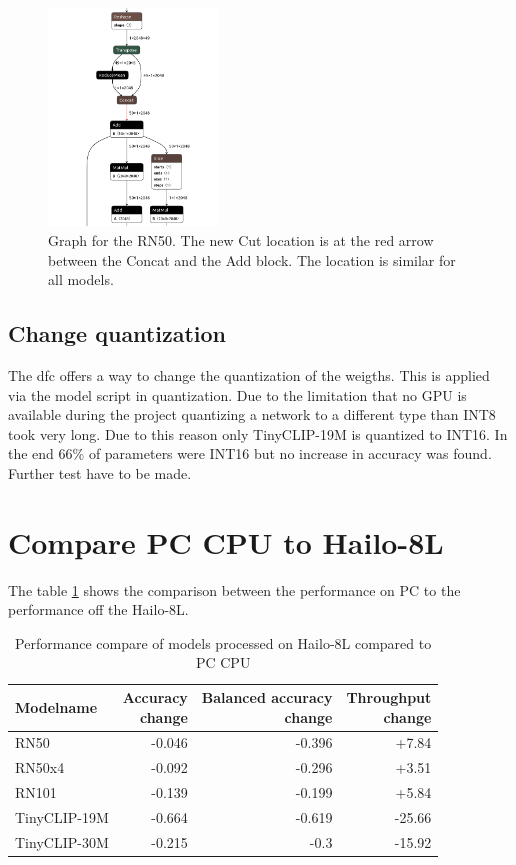 \begin{figure}[]
    \centering
    \includegraphics[width=0.4\textwidth]{Images/Implementation/secondcutlocation.png}
    \caption{Graph for the RN50. The new Cut location is at the red arrow between the Concat and the Add block.
    The location is similar for all models.}
    \label{methods:fig:rn50newcut}
\end{figure}

\subsection{Change quantization}

The \acrshort{dfc} offers a way to change the quantization of the weigths.
This is applied via the model script in quantization.
Due to the limitation that no GPU is available during the project quantizing a network to a different type than INT8 took very long.
Due to this reason only TinyCLIP-19M is quantized to INT16.
In the end 66\% of parameters were INT16 but no increase in accuracy was found.
Further test have to be made.

\section{Compare PC CPU to Hailo-8L}
The table \ref{methods:tab:comparehailopc} shows the comparison between the performance on PC to the performance off the Hailo-8L.
\begin{table}[h!]
    \centering
    \begin{tabular}{l|rrr}
    \hline
    Modelname & \makecell{Accuracy\\change} &  \makecell{Balanced accuracy\\change}&\makecell{Throughput\\change}
    \\
    \hline
    RN50 & -0.046 & -0.396 &  +7.84\\
    RN50x4 & -0.092 & -0.296 &  +3.51\\
    RN101 & -0.139&  -0.199& +5.84\\  
    TinyCLIP-19M &-0.664 & -0.619 & -25.66\\ 
    TinyCLIP-30M &-0.215 & -0.3 & -15.92\\ 
    \end{tabular}
    \caption{Performance compare of models processed on Hailo-8L compared to PC CPU}
    \label{methods:tab:comparehailopc}
\end{table}